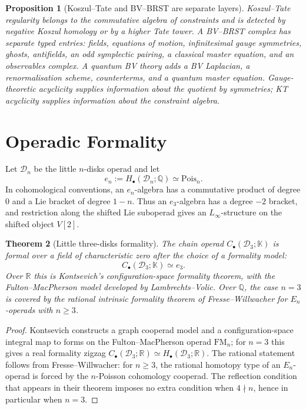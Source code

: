 \documentclass[11pt]{amsart}
\newtheorem{theorem}{Theorem}[section]
\newtheorem{proposition}[theorem]{Proposition}
\theoremstyle{definition}
\theoremstyle{remark}
\providecommand{\cD}{\mathcal{D}}
\providecommand{\RR}{\mathbb{R}}
\providecommand{\QQ}{\mathbb{Q}}
\providecommand{\FM}{\mathrm{FM}}
\providecommand{\Pois}{\mathrm{Pois}}
\providecommand{\Linf}{L_\infty}
\begin{document}
\begin{proposition}[Koszul--Tate and BV--BRST are separate layers]
\label{prop:kt-bv-brst}
Koszul--Tate regularity belongs to the commutative algebra of
constraints and is detected by negative Koszul homology or by a higher
Tate tower. A BV--BRST complex has separate typed entries: fields,
equations of motion, infinitesimal gauge symmetries, ghosts, antifields,
an odd symplectic pairing, a classical master equation, and an
observables complex. A quantum BV theory adds a BV Laplacian, a
renormalisation scheme, counterterms, and a quantum master equation.
Gauge-theoretic acyclicity supplies information about the quotient by
symmetries; KT acyclicity supplies information about the constraint
algebra.
\end{proposition}

\section{Operadic Formality}
\label{sec:operadic-formality}

Let $\cD_n$ be the little $n$-disks operad and let
\[
e_n := H_\bullet(\cD_n;\QQ) \simeq \Pois_n .
\]
In cohomological conventions, an $e_n$-algebra has a commutative product
of degree $0$ and a Lie bracket of degree $1-n$. Thus an $e_3$-algebra
has a degree $-2$ bracket, and restriction along the shifted Lie
suboperad gives an $\Linf$-structure on the shifted object $V[2]$.

\begin{theorem}[Little three-disks formality]
\label{thm:D3-formality}
The chain operad $C_\bullet(\cD_3;\mathbb K)$ is formal over a field of
characteristic zero after the choice of a formality model:
\[
C_\bullet(\cD_3;\mathbb K)\simeq e_3 .
\]
Over $\RR$ this is Kontsevich's configuration-space formality theorem,
with the Fulton--MacPherson model developed by Lambrechts--Volic. Over
$\QQ$, the case $n=3$ is covered by the rational intrinsic formality
theorem of Fresse--Willwacher for $E_n$-operads with $n\geq 3$.
\end{theorem}

\begin{proof}
Kontsevich constructs a graph cooperad model and a configuration-space
integral map to forms on the Fulton--MacPherson operad $\FM_n$; for
$n=3$ this gives a real formality zigzag
$C_\bullet(\cD_3;\RR)\simeq H_\bullet(\cD_3;\RR)$. The rational
statement follows from Fresse--Willwacher: for $n\geq 3$, the rational
homotopy type of an $E_n$-operad is forced by the $n$-Poisson cohomology
cooperad. The reflection condition that appears in their theorem imposes
no extra condition when $4\nmid n$, hence in particular when $n=3$.
\end{proof}
\end{document}
